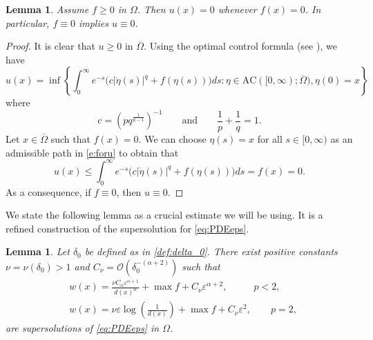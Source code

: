 \documentclass[11pt,reqno]{amsart}
\numberwithin{figure}{section}
\theoremstyle{plain}
\newtheorem{lem}[thm]{Lemma}
\theoremstyle{remark}
\numberwithin{equation}{section}
\begin{document}
\begin{lem}\label{lem:f=0} Assume $f\geq 0$ in $\Omega$. Then $u(x) = 0$ whenever $f(x) = 0$. In particular, $f \equiv 0$ implies $u \equiv 0$.
\end{lem}
\begin{proof} It is clear that $u\geq 0$ in $\overline{\Omega}$. Using the optimal control formula (see \cite{Bardi1997,Hung2019}), we have
\begin{equation}\label{e:foru}
    u(x) = \inf \left\lbrace \int_0^\infty e^{-  s}\Big(c|\dot{\eta}(s)|^{q} +f(\eta(s))\Big)ds: \eta\in \mathrm{AC}([0,\infty);\overline{\Omega}), \eta(0) = x\right\rbrace
\end{equation}
where 
\begin{equation*}
    c = \left(pq^{\frac{1}{p-1}}\right)^{-1} \qquad\text{and}\qquad \frac{1}{p} + \frac{1}{q} = 1.
\end{equation*}
Let $x\in \overline{\Omega}$ such that $f(x) = 0$. We can choose $\eta(s) = x$ for all $s\in [0,\infty)$ as an admissible path in \eqref{e:foru} to obtain that
\begin{equation*}
    u(x) \leq  \int_0^\infty e^{-  s}\Big(c|\dot{\eta}(s)|^{q} +f(\eta(s))\Big)ds = f(x) =  0.
\end{equation*}
As a consequence, if $f\equiv 0$, then $u\equiv 0$.
\end{proof}
\noindent We state the following lemma as a crucial estimate we will be using. It is a refined construction of the supersolution for \eqref{eq:PDEeps}.
\begin{lem}\label{lem:super_refined} Let $\delta_0$ be defined as in \eqref{def:delta_0}. There exist positive constants $\nu = \nu(\delta_0)> 1$ and $C_\nu =\mathcal{O}\left(\delta_0^{-(\alpha+2)}\right)$ such that
\begin{equation}\label{e:superwa}
\begin{split}
    &w(x) = \frac{\nu C_\alpha \varepsilon^{\alpha+1}}{d(x)^\alpha} + \max f + C_\nu \varepsilon^{\alpha+2}, \qquad\;\;\,  p<2,\\
    &w(x) = \nu \varepsilon \log\left(\frac{1}{d(x)}\right) + \max f+ C_\nu \varepsilon^2, \qquad  p=2,
\end{split}
\end{equation}
are supersolutions of \eqref{eq:PDEeps} in $\Omega$. 
\end{lem}
\end{document}
